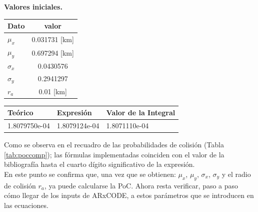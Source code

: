 \begin{minipage}[t]{0.28\textwidth}
{\bf{Valores iniciales.}}\\

\begin{tabular}{|lc|}
\hline
 Dato & valor \\
\hline
$\mu_{x}$ & 0.031731 [km]\\
$\mu_{y}$ & 0.697294 [km]\\
$\sigma_{x}$ & 0.0430576\\
$\sigma_{y}$ & 0.2941297\\
$r_{a}$ & 0.01 [km]\\
\hline
\end{tabular}
\end{minipage}
\begin{minipage}[t]{0.7\textwidth}
\begin{mdframed}[
        linecolor=red,linewidth=2pt,%
        frametitlerule=true,%
        apptotikzsetting={\tikzset{mdfframetitlebackground/.append style={%
            shade,left color=white, right color=blue!20}}}, 
        frametitlerulecolor=blue,
        frametitlerulewidth=1pt, innertopmargin=\topskip,
        frametitle={Probabilidad de Colisi\'on},
        outerlinewidth=1.25pt
    ]
\large
{}
\begin{tabular}{|l|l|l|}
  \hline
 Te\'orico & Expresi\'on & Valor de la Integral\\
 \hline
 1.8079750e-04 & 1.8079124e-04 & 1.8071110e-04\\
 \hline
\end{tabular}
\label{tab:poccomp}
\end{mdframed}
\end{minipage}

\vspace{0.5cm}
Como se observa en el recuadro de las probabilidades de colisi\'on (Tabla \ref{tab:poccomp}); las f\'ormulas implementadas coinciden con el valor de la bibliograf\'ia hasta el cuarto d\'igito significativo de la expresi\'on.\\

En este punto se confirma que, una vez que se obtienen: $\mu_{x}$, $\mu_{y}$, $\sigma_{x}$, $\sigma_{y}$ y el radio de colisi\'on $r_{a}$, ya puede calcularse la PoC. 
Ahora resta verificar, paso a paso c\'omo llegar de los inputs de ARxCODE, a estos par\'ametros que se introducen en las ecuaciones. \\

